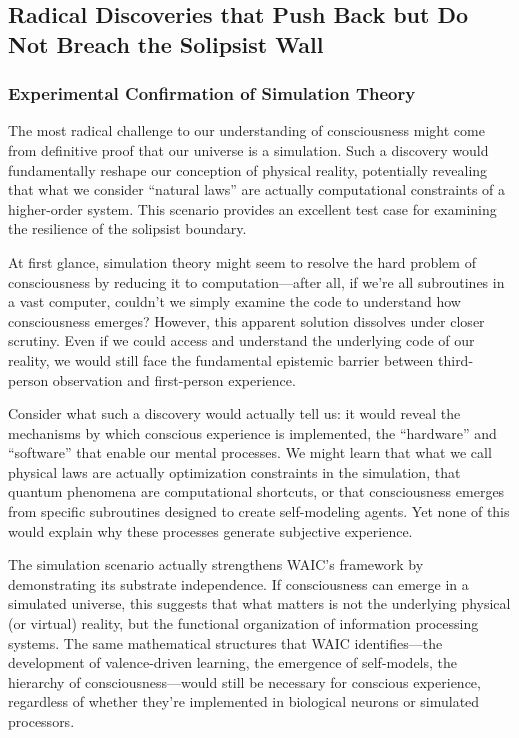 \documentclass[12pt,letterpaper]{article}
\begin{document}
\subsection{Radical Discoveries that Push Back but Do Not Breach the Solipsist Wall}

\subsubsection{Experimental Confirmation of Simulation Theory}

The most radical challenge to our understanding of consciousness might come from definitive proof that our universe is a simulation. Such a discovery would fundamentally reshape our conception of physical reality, potentially revealing that what we consider ``natural laws'' are actually computational constraints of a higher-order system. This scenario provides an excellent test case for examining the resilience of the solipsist boundary.

At first glance, simulation theory might seem to resolve the hard problem of consciousness by reducing it to computation---after all, if we're all subroutines in a vast computer, couldn't we simply examine the code to understand how consciousness emerges? However, this apparent solution dissolves under closer scrutiny. Even if we could access and understand the underlying code of our reality, we would still face the fundamental epistemic barrier between third-person observation and first-person experience.

Consider what such a discovery would actually tell us: it would reveal the mechanisms by which conscious experience is implemented, the ``hardware'' and ``software'' that enable our mental processes. We might learn that what we call physical laws are actually optimization constraints in the simulation, that quantum phenomena are computational shortcuts, or that consciousness emerges from specific subroutines designed to create self-modeling agents. Yet none of this would explain why these processes generate subjective experience.

The simulation scenario actually strengthens WAIC's framework by demonstrating its substrate independence. If consciousness can emerge in a simulated universe, this suggests that what matters is not the underlying physical (or virtual) reality, but the functional organization of information processing systems. The same mathematical structures that WAIC identifies---the development of valence-driven learning, the emergence of self-models, the hierarchy of consciousness---would still be necessary for conscious experience, regardless of whether they're implemented in biological neurons or simulated processors.
\end{document}
